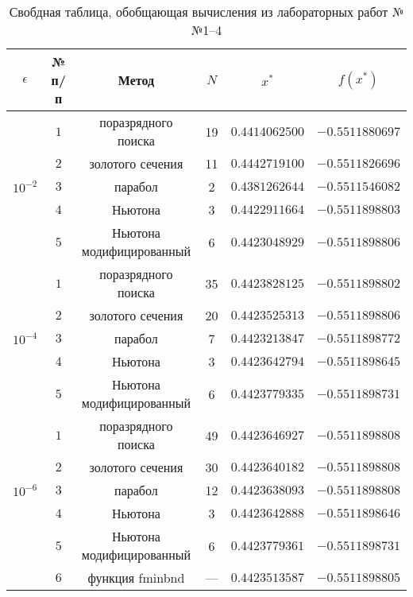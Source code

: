 \begin{table}[h]
    \centering
    \small
    \caption{Свобдная таблица, обобщающая вычисления из лабораторных работ №№1--4}
    \label{tbl:cmp}

    \begin{tabular}{|c|c|c|c|c|c|}
        \hline
        $\epsilon$ & № п/п & Метод & $N$ & $x^*$ & $f(x^*)$ \\\hline
        
        \multirow{5}{*}{$10^{-2}$} & $1$ & поразрядного поиска & 19 & $0.4414062500$ & $-0.5511880697$ \\
        & $2$ & золотого сечения & 11 & $0.4442719100$ & $-0.5511826696$ \\
        & $3$ & парабол & 2 & $0.4381262644$ & $-0.5511546082$ \\
        & $4$ & Ньютона & 3 & $0.4422911664$ & $-0.5511898803$ \\
        & $5$ & Ньютона модифицированный & 6 & $0.4423048929$ & $-0.5511898806$ \\\hline

        \multirow{5}{*}{$10^{-4}$} & $1$ & поразрядного поиска & 35 & $0.4423828125$ & $-0.5511898802$ \\
        & $2$ & золотого сечения & 20 & $0.4423525313$ & $-0.5511898806$ \\
        & $3$ & парабол & 7 & $0.4423213847$ & $-0.5511898772$ \\
        & $4$ & Ньютона & 3 & $0.4423642794$ & $-0.5511898645$ \\
        & $5$ & Ньютона модифицированный & 6 & $0.4423779335$ & $-0.5511898731$ \\\hline
        
        \multirow{5}{*}{$10^{-6}$} & $1$ & поразрядного поиска & 49 & $0.4423646927$ & $-0.5511898808$ \\
        & $2$ & золотого сечения & 30 & $0.4423640182$ & $-0.5511898808$ \\
        & $3$ & парабол & 12 & $0.4423638093$ & $-0.5511898808$ \\
        & $4$ & Ньютона & 3 & $0.4423642888$ & $-0.5511898646$ \\
        & $5$ & Ньютона модифицированный & 6 & $0.4423779361$ & $-0.5511898731$ \\
        & $6$ & функция fminbnd & --- & $0.4423513587$ & $-0.5511898805$ \\\hline
    \end{tabular}
\end{table}
